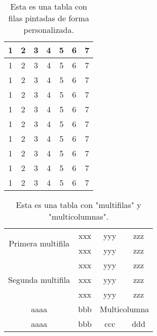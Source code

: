 \documentclass{GVT_CONAE_Class}
\begin{document}
\begin{table}[H]
    \centering
    \caption{Esta es una tabla con filas pintadas de forma personalizada.}
    \label{tab:my_label2}
    \begin{tabular}{ccccccc}
        \hline
        1 & 2 & 3 & 4 & 5 & 6 & 7\\
        \hline
        1 & 2 & 3 & 4 & 5 & 6 & 7\\
        \rowcolor{MiColor1}
        1 & 2 & 3 & 4 & 5 & 6 & 7\\
        \rowcolor{MiColor2}
        1 & 2 & 3 & 4 & 5 & 6 & 7\\
        1 & 2 & 3 & 4 & 5 & 6 & 7\\
        1 & 2 & 3 & 4 & 5 & 6 & 7\\
        \rowcolor{MiColor3}
        1 & 2 & 3 & 4 & 5 & 6 & 7\\
        \rowcolor{MiColor3}
        1 & 2 & 3 & 4 & 5 & 6 & 7\\
        \rowcolor{MiColor3}
        1 & 2 & 3 & 4 & 5 & 6 & 7\\
        1 & 2 & 3 & 4 & 5 & 6 & 7\\
        \hline
    \end{tabular}
\end{table}


\begin{table}[H]
    \centering
    \caption{Esta es una tabla con "multifilas" y "multicolumnas".}
    \label{tab:my_label3}
    \begin{tabular}{|c|c|c|c|}
        \hline
         \multirow{2}{*}{Primera multifila} & xxx & yyy & zzz \\ \cline{2-4}
                                            & xxx & yyy & zzz \\
        \hline
        \multirow{3}{*}{Segunda multifila} & xxx & yyy & zzz \\ \cline{2-4}
                                           & xxx & yyy & zzz \\ \cline{2-4}
                                           & xxx & yyy & zzz \\
        \hline
                                     aaaa  & bbb & \multicolumn{2}{c|}{Multicolumna} \\
        \hline
                                     aaaa  & bbb & ccc & ddd \\
        \hline
    \end{tabular}
\end{table}
\end{document}
